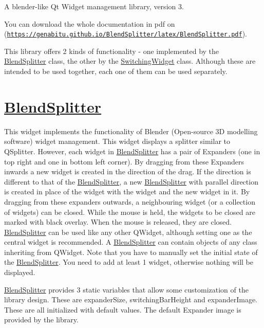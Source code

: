 A blender-\/like Qt Widget management library, version 3.

You can download the whole documentation in pdf on (\href{https://genabitu.github.io/BlendSplitter/latex/BlendSplitter.pdf}{\tt https\+://genabitu.\+github.\+io/\+Blend\+Splitter/latex/\+Blend\+Splitter.\+pdf}).

This library offers 2 kinds of functionality -\/ one implemented by the \hyperlink{class_blend_splitter}{Blend\+Splitter} class, the other by the \hyperlink{class_switching_widget}{Switching\+Widget} class. Although these are intended to be used together, each one of them can be used separately.

\section*{\hyperlink{class_blend_splitter}{Blend\+Splitter} }

This widget implements the functionality of Blender (Open-\/source 3D modelling software) widget management. This widget displays a splitter similar to Q\+Splitter. However, each widget in \hyperlink{class_blend_splitter}{Blend\+Splitter} has a pair of Expanders (one in top right and one in bottom left corner). By dragging from these Expanders inwards a new widget is created in the direction of the drag. If the direction is different to that of the \hyperlink{class_blend_splitter}{Blend\+Splitter}, a new \hyperlink{class_blend_splitter}{Blend\+Splitter} with parallel direction is created in place of the widget with the widget and the new widget in it. By dragging from these expanders outwards, a neighbouring widget (or a collection of widgets) can be closed. While the mouse is held, the widgets to be closed are marked with black overlay. When the mouse is released, they are closed. \hyperlink{class_blend_splitter}{Blend\+Splitter} can be used like any other Q\+Widget, although setting one as the central widget is recommended. A \hyperlink{class_blend_splitter}{Blend\+Splitter} can contain objects of any class inheriting from Q\+Widget. Note that you have to manually set the initial state of the \hyperlink{class_blend_splitter}{Blend\+Splitter}. You need to add at least 1 widget, otherwise nothing will be displayed.

\hyperlink{class_blend_splitter}{Blend\+Splitter} provides 3 static variables that allow some customization of the library design. These are expander\+Size, switching\+Bar\+Height and expander\+Image. These are all initialized with default values. The default Expander image is provided by the library.


